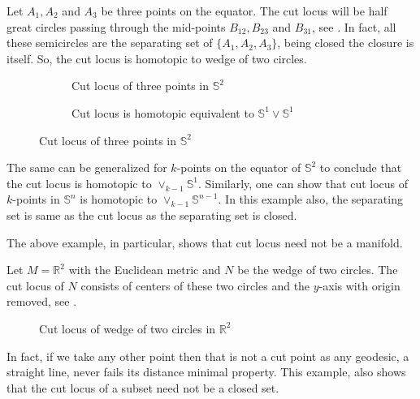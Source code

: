 \begin{eg}\label{eg:cutLocusOfkPoints}
    Let $A_1,A_2$ and $A_3$ be three points on the equator. The cut locus will be half great circles passing through the mid-points $B_{12},B_{23}$ and $B_{31}$, see . In fact, all these semicircles are the separating set of $\{A_1,A_2,A_3\}$, being closed the closure is itself. So, the cut locus is homotopic to wedge of two circles. 
    \begin{figure}[!htpb]
        \centering
        \begin{subfigure}{0.65\textwidth}
            \centering
            \caption{Cut locus of three points in $\mathbb{S}^2$}
            \label{fig:Example-CutLocus-SphereThreePoints}
        \end{subfigure}
        \begin{subfigure}{0.25\textwidth}
            \centering
            \caption{Cut locus is homotopic equivalent to $\mathbb{S}^1\vee \mathbb{S}^1$ }
            \label{fig:Example-CutLocus-SphereThreePoints-02}
        \end{subfigure}
        \caption{Cut locus of three points in $\mathbb{S}^2$}
    \end{figure}
    The same can be generalized for $k$-points on the equator of $\mathbb{S}^2$ to conclude that the cut locus is homotopic to $\vee_{k-1}\mathbb{S}^1$.  Similarly, one can show that cut locus of $k$-points in $\mathbb{S}^n$ is homotopic to $\vee_{k-1}\mathbb{S}^{n-1}$. In this example also, the separating set is same as the cut locus as the separating set is closed. 
\end{eg}

\hf The above example, in particular, shows that cut locus need not be a manifold.

\begin{eg}
    Let $M=\mathbb{R}^2$ with the Euclidean metric and $N$ be the wedge of two circles. The cut locus of $N$ consists of centers of these two circles and the $y$-axis with origin removed, see .
    \begin{figure}[!htb]
        \centering
        \caption{Cut locus of wedge of two circles in $\mathbb{R}^2$}
        \label{fig:Example-CutLocus-Figure8}
    \end{figure}
    In fact, if we take any other point then that is not a cut point as any geodesic, a straight line, never fails its distance minimal property. This example, also shows that the cut locus of a subset need not be a closed set.
\end{eg}

